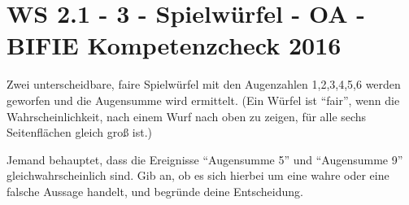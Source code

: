 \section{WS 2.1 - 3 - Spielwürfel - OA - BIFIE Kompetenzcheck 2016}

\begin{beispiel}[WS 2.1]{1} %
				Zwei unterscheidbare, faire Spielwürfel mit den Augenzahlen 1,2,3,4,5,6 werden geworfen und die Augensumme wird ermittelt. (Ein Würfel ist "`fair"', wenn die Wahrscheinlichkeit, nach einem Wurf nach oben zu zeigen, für alle sechs Seitenflächen gleich groß ist.)

Jemand behauptet, dass die Ereignisse "`Augensumme 5"' und "`Augensumme 9"' gleichwahrscheinlich sind. Gib an, ob es sich hierbei um eine wahre oder eine falsche Aussage handelt, und begründe deine Entscheidung.\\

\end{beispiel}
